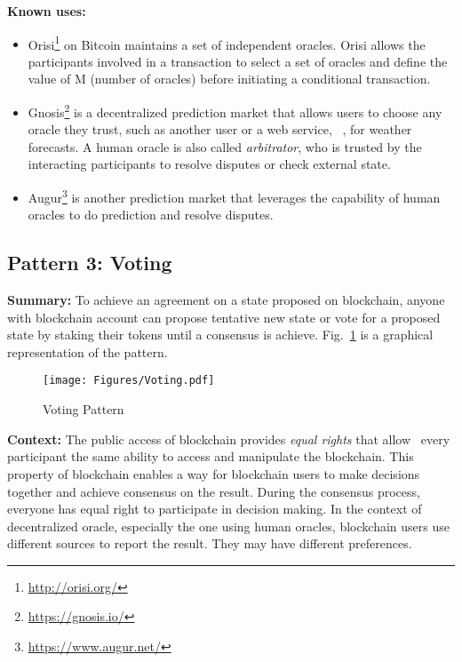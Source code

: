 \vspace{0.5em}\noindent \textbf{Known uses:}
\begin{itemize}
  \item Orisi\footnote{\url{http://orisi.org/}} on Bitcoin maintains a set of independent oracles. Orisi allows the participants involved in a transaction to select a set of oracles and define the value of M (number of oracles) before initiating a conditional transaction.
  \item Gnosis\footnote{\label{gnosis}\url{https://gnosis.io/}} is a decentralized prediction market that allows users to choose any oracle they trust, such as another user or a web service, \eg~, for weather forecasts. A human oracle is also called \textit{arbitrator}, who is trusted by the interacting participants to resolve disputes or check external state. 
  \item Augur\footnote{\label{augur}\url{https://www.augur.net/}} is another prediction market that leverages the capability of human oracles to do prediction and resolve disputes.
\end{itemize}



\subsection{ \textbf{Pattern 3: Voting}}
\label{sec:voting}

\noindent \textbf{Summary:} To achieve an agreement on a state proposed on blockchain, anyone with blockchain account can propose tentative new state or vote for a proposed state by staking their tokens until a consensus is achieve. Fig.~\ref{fig:voting} is a graphical representation of the pattern.

\begin{figure}[t]
\begin{center}
\texttt{[image: Figures/Voting.pdf]}
\caption{Voting Pattern}\label{fig:voting}
\end{center}
\end{figure}


\vspace{0.5em}\noindent \textbf{Context:} 
The public access of blockchain provides \textit{equal rights} that allow~\cite{Sherry:ICSA2017} every participant the same ability to access and manipulate the blockchain. This property of blockchain enables a way for blockchain users to make decisions together and achieve consensus on the result. During the consensus process, everyone has equal right to participate in decision making. In the context of decentralized oracle, especially the one using human oracles, blockchain users use different sources to report the result. They may have different preferences. %

